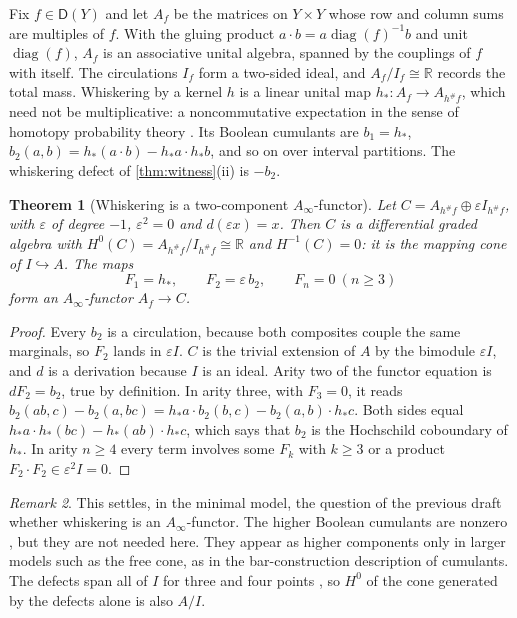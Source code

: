 \documentclass[11pt]{article}
\newtheorem{theorem}{Theorem}[section]
\theoremstyle{definition}
\theoremstyle{remark}
\newtheorem{remark}[theorem]{Remark}
\newcommand{\D}{\mathsf{D}}
\begin{document}
Fix $f\in\D(Y)$ and let $A_f$ be the matrices on $Y\times Y$ whose row and column sums are multiples of $f$. With the
gluing product $a\cdot b=a\operatorname{diag}(f)^{-1}b$ and unit $\operatorname{diag}(f)$, $A_f$ is an associative unital algebra, spanned by
the couplings of $f$ with itself. The circulations $I_f$ form a two-sided ideal, and $A_f/I_f\cong\mathbb R$ records the total
mass. Whiskering by a kernel $h$ is a linear unital map $h_*\colon A_f\to A_{h^\#f}$, which need not be multiplicative: a
noncommutative expectation in the sense of homotopy probability theory \cite{HPT1,HPT2}. Its Boolean cumulants
\cite{SpeicherWoroudi1997} are $b_1=h_*$, $b_2(a,b)=h_*(a\cdot b)-h_*a\cdot h_*b$, and so on over interval partitions. The
whiskering defect of \cref{thm:witness}(ii) is $-b_2$.

\begin{theorem}[Whiskering is a two-component $A_\infty$-functor]\label{thm:sqzero}
Let $C=A_{h^\#f}\oplus\varepsilon I_{h^\#f}$, with $\varepsilon$ of degree $-1$, $\varepsilon^2=0$ and $d(\varepsilon x)=x$. Then $C$ is a differential graded
algebra with $H^0(C)=A_{h^\#f}/I_{h^\#f}\cong\mathbb R$ and $H^{-1}(C)=0$: it is the mapping cone of $I\hookrightarrow A$. The maps
\[
F_1=h_*,\qquad F_2=\varepsilon\,b_2,\qquad F_n=0\ (n\ge3)
\]
form an $A_\infty$-functor $A_f\to C$.
\end{theorem}
\begin{proof}
Every $b_2$ is a circulation, because both composites couple the same marginals, so $F_2$ lands in $\varepsilon I$. $C$ is the
trivial extension of $A$ by the bimodule $\varepsilon I$, and $d$ is a derivation because $I$ is an ideal. Arity two of the functor
equation is $dF_2=b_2$, true by definition. In arity three, with $F_3=0$, it reads
$b_2(ab,c)-b_2(a,bc)=h_*a\cdot b_2(b,c)-b_2(a,b)\cdot h_*c$. Both sides equal $h_*a\cdot h_*(bc)-h_*(ab)\cdot h_*c$, which says that $b_2$
is the Hochschild coboundary of $h_*$. In arity $n\ge4$ every term involves some $F_k$ with $k\ge3$ or a product
$F_2\cdot F_2\in\varepsilon^2I=0$.
\end{proof}

\begin{remark}
This settles, in the minimal model, the question of the previous draft whether whiskering is an $A_\infty$-functor.
The higher Boolean cumulants are nonzero \cite[\S9]{Awasthi-Family}, but they are not needed here. They appear as
higher components only in larger models such as the free cone, as in the bar-construction description of
cumulants. The defects span all of $I$ for three and four points \cite[\S10]{Awasthi-Family}, so $H^0$ of the cone
generated by the defects alone is also $A/I$.
\end{remark}
\end{document}
